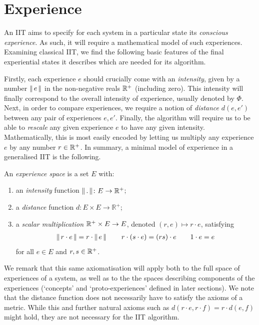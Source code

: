 \section{Experience} \label{sec:Experience}

An IIT aims to specify for each system in a particular state its \emph{conscious experience}. As such, it will require a mathematical model of such experiences. Examining classical IIT, we find the following basic features of the final experiential states it describes which are needed for its algorithm.

Firstly, each experience $e$ should crucially come with an \emph{intensity}, given by a number $\operatorname{| \hspace*{-0.1em}|} e \operatorname{| \hspace*{-0.1em}|}$ in the non-negative reals  $\mathbb{R}^+$ (including zero). 
This intensity will finally correspond to the overall intensity of experience, usually denoted by $\Phi$. Next, in order to compare experiences, we require a notion of \emph{distance} $d(e,e')$ between any pair of experiences $e, e'$. Finally, the algorithm will require us to be able to \emph{rescale} any given experience $e$ to have any given intensity. Mathematically, this is most easily encoded by letting us multiply any experience $e$ by any number $r \in \mathbb{R}^+$.
In summary, a minimal model of experience in a generalised IIT is the following.

\begin{definition} \label{def:exp-space}
An \emph{experience space} is a set $E$ with: 
\begin{enumerate}[label=\arabic*.]
\item 
an \emph{intensity} function $\operatorname{| \hspace*{-0.1em}|} . \operatorname{| \hspace*{-0.1em}|} \colon E \to \mathbb{R}^+$;
\item 
a \emph{distance} function $d \colon E \times E \to \mathbb{R}^+$;
\item 
a \emph{scalar multiplication} $\mathbb{R}^+ \times E \to E$, denoted $(r,e) \mapsto r \cdot e$, satisfying
\begin{align*}
\operatorname{| \hspace*{-0.1em}|} r \cdot e \operatorname{| \hspace*{-0.1em}|} = r \cdot \operatorname{| \hspace*{-0.1em}|} e \operatorname{| \hspace*{-0.1em}|} \qquad 
r \cdot (s \cdot e) = (rs) \cdot e \qquad
1 \cdot e = e
\end{align*}
for all $e \in E$ and $r, s \in \mathbb{R}^+$.
\end{enumerate}
\end{definition}


We remark that this same axiomatisation will apply both to the full space of experiences of a system, as well as to the the spaces describing components of the experiences (`concepts' and `proto-experiences' defined in later sections). We note that the distance function does not necessarily have to satisfy the axioms of a metric. While this and further natural axioms such as $d(r \cdot e, r \cdot f) = r \cdot d(e,f)$ might hold, they are not necessary for the IIT algorithm.

